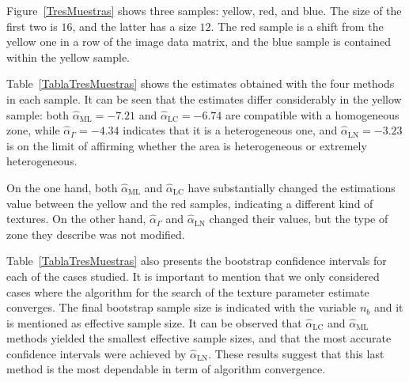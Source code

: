 \documentclass[twocolumn]{svjour3}
\begin{document}
	Figure~\ref{TresMuestras} shows three samples: yellow, red, and blue. 
	The size of the first two is $16$, and the latter has a size $12$. 
	The red sample is a shift from the yellow one in a row of the image data matrix, and the blue sample is contained within the yellow sample.
	
	Table~\ref{TablaTresMuestras} shows the estimates obtained with the four methods in each sample. 
	It can be seen that the estimates differ considerably in the yellow sample: 
	both $\widehat{\alpha}_{\text{{ML}}}=-7.21$ and $\widehat{\alpha}_{\text{{LC}}}=-6.74$ are compatible with a homogeneous zone, while $\widehat{\alpha}_{\Gamma}=-4.34$ indicates that it is a heterogeneous one, and $\widehat{\alpha}_{\text{{LN}}}=-3.23$ is on the limit of affirming whether the area is heterogeneous or extremely heterogeneous.
	
	On the one hand, both $\widehat{\alpha}_{\text{{ML}}}$ and $\widehat{\alpha}_{\text{{LC}}}$ have substantially changed the estimations value between the yellow and the red samples, indicating a different kind of textures. 
	On the other hand, $\widehat{\alpha}_{\Gamma}$ and $\widehat{\alpha}_{\text{{LN}}}$ changed their values, but the type of zone they describe was not modified.
	
	Table~\ref{TablaTresMuestras} also presents the bootstrap confidence intervals for each of the cases studied. 
	It is important to mention that we only considered cases where the algorithm for the search of the texture parameter estimate converges. 
	The final bootstrap sample size is indicated with the variable $n_b$ and it is mentioned as effective sample size.  
	It can be observed that $\widehat{\alpha}_{\text{{LC}}}$ and $\widehat{\alpha}_{\text{{ML}}}$ methods yielded the smallest effective sample sizes, and that the most accurate confidence intervals were achieved by $\widehat{\alpha}_{\text{{LN}}}$.
	These results suggest that this last method is the most dependable in term of algorithm convergence. 
	
\end{document}
